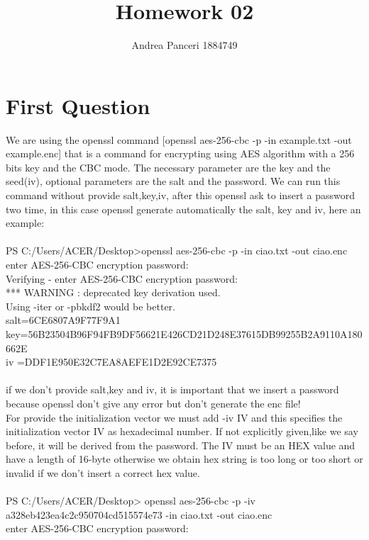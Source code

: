 \documentclass{article}
\title{Homework 02}
\author{Andrea Panceri 1884749}
\begin{document}
\maketitle

\section{First Question}
We are using the openssl command [openssl aes-256-cbc -p -in example.txt -out example.enc] that is a command for encrypting using AES algorithm with a 256 bits key and the CBC mode.
The necessary parameter are the key and the seed(iv), optional parameters are the salt and the password.
We can run this command without provide salt,key,iv, after this openssl ask to insert a password two time, in this case openssl generate automatically the salt, key and iv, here an example:\\\\
PS C:/Users/ACER/Desktop>openssl aes-256-cbc -p -in ciao.txt -out ciao.enc\\
enter AES-256-CBC encryption password:\\
Verifying - enter AES-256-CBC encryption password:\\
*** WARNING : deprecated key derivation used.\\
Using -iter or -pbkdf2 would be better.\\
salt=6CE6807A9F77F9A1\\
key=56B23504B96F94FB9DF56621E426CD21D248E37615DB99255B2A9110A180662E\\
iv =DDF1E950E32C7EA8AEFE1D2E92CE7375\\
\\
if we don't provide salt,key and iv, it is important that we insert a password because openssl don't give any error but don't generate the enc file!\\
For provide the initialization vector we must add -iv IV and this specifies the initialization vector IV as hexadecimal number. If not explicitly given,like we say before, it will be derived from the password. The IV must be an HEX value and have a length of 16-byte otherwise we obtain hex string is too long or too short or invalid if we don't insert a correct hex value.\\\\
PS C:/Users/ACER/Desktop> openssl aes-256-cbc -p -iv a328eb423ea4c2c950704cd515574e73 -in ciao.txt -out ciao.enc\\
enter AES-256-CBC encryption password:\\
\end{document}
